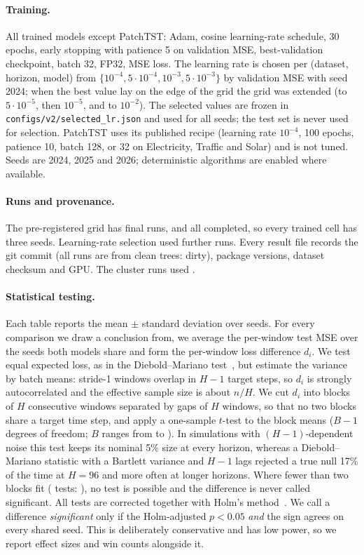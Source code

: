 \documentclass[11pt,a4paper]{article}
\begin{document}
\paragraph{Training.}
All trained models except PatchTST: Adam, cosine learning-rate schedule, 30 epochs, early stopping with patience 5 on validation MSE, best-validation checkpoint, batch 32, FP32, MSE loss. The learning rate is chosen per (dataset, horizon, model) from $\{10^{-4},5\cdot10^{-4},10^{-3},5\cdot10^{-3}\}$ by validation MSE with seed 2024; when the best value lay on the edge of the grid the grid was extended (to $5\cdot10^{-5}$, then $10^{-5}$, and to $10^{-2}$). The \vLrCells{} selected values are frozen in \nolinkurl{configs/v2/selected_lr.json} and used for all seeds; the test set is never used for selection. PatchTST uses its published recipe (learning rate $10^{-4}$, 100 epochs, patience 10, batch 128, or 32 on Electricity, Traffic and Solar) and is not tuned. Seeds are 2024, 2025 and 2026; deterministic algorithms are enabled where available.

\paragraph{Runs and provenance.}
The pre-registered grid has \vRunsExpected{} final runs, and all \vRunsFinal{} completed, so every trained cell has three seeds. Learning-rate selection used \vRunsLrsel{} further runs. Every result file records the git commit (all runs are from clean trees: \vDirtyRuns{} dirty), package versions, dataset checksum and GPU. The cluster runs used \vGpuList{}.

\paragraph{Statistical testing.}
Each table reports the mean $\pm$ standard deviation over seeds. For every comparison we draw a conclusion from, we average the per-window test MSE over the seeds both models share and form the per-window loss difference $d_i$. We test equal expected loss, as in the Diebold--Mariano test~\cite{diebold1995comparing}, but estimate the variance by batch means: stride-1 windows overlap in $H-1$ target steps, so $d_i$ is strongly autocorrelated and the effective sample size is about $n/H$. We cut $d_i$ into blocks of $H$ consecutive windows separated by gaps of $H$ windows, so that no two blocks share a target time step, and apply a one-sample $t$-test to the block means ($B-1$ degrees of freedom; $B$ ranges from \vMinBlocks{} to \vMaxBlocks). In simulations with $(H-1)$-dependent noise this test keeps its nominal 5\% size at every horizon, whereas a Diebold--Mariano statistic with a Bartlett variance and $H-1$ lags rejected a true null 17\% of the time at $H=96$ and more often at longer horizons. Where fewer than two blocks fit (\vNumUntestable{} tests: \vUntestableWhere), no test is possible and the difference is never called significant. All \vNumTests{} tests are corrected together with Holm's method~\cite{holm1979simple}. We call a difference \emph{significant} only if the Holm-adjusted $p<0.05$ \emph{and} the sign agrees on every shared seed. This is deliberately conservative and has low power, so we report effect sizes and win counts alongside it.
\end{document}
